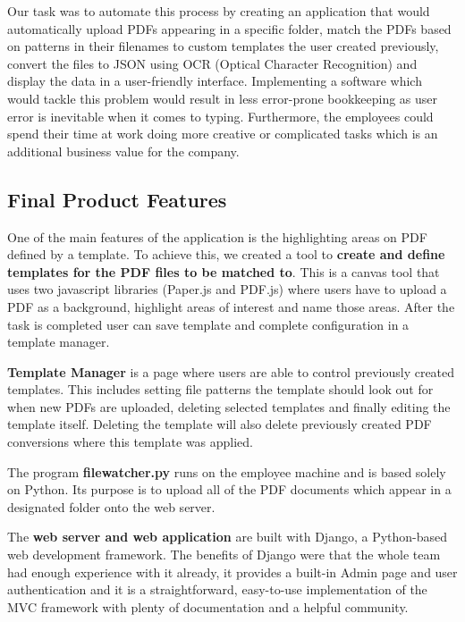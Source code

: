 \documentclass{l3proj}
\begin{document}
Our task was to automate this process by creating an application that would automatically upload PDFs appearing in a specific folder, match the PDFs based on patterns in their filenames to custom templates the user created previously, convert the files to JSON using OCR (Optical Character Recognition) and display the data in a user-friendly interface.
Implementing a software which would tackle this problem would result in less error-prone bookkeeping as user error is inevitable when it comes to typing. Furthermore, the employees could spend their time at work doing more creative or complicated tasks which is an additional business value for the company.
\subsection{Final Product Features}

One of the main features of the application is the highlighting areas on PDF defined by a template. To achieve this, we created a tool to \textbf{create and define templates for the PDF files to be matched to}. This is a canvas tool that uses two javascript libraries (Paper.js and PDF.js) where users have to upload a PDF as a background, highlight areas of interest and name those areas. After the task is completed user can save template and complete configuration in a template manager.

\textbf{Template Manager} is a page where users are able to control previously created templates. This includes setting file patterns the template should look out for when new PDFs are uploaded, deleting selected templates and finally editing the template itself. Deleting the template will also delete previously created PDF conversions where this template was applied.

The program \textbf{filewatcher.py} runs on the employee machine and is based solely on Python. Its purpose is to upload all of the PDF documents which appear in a designated folder onto the web server.

The \textbf{web server and web application} are built with Django, a Python-based web development framework. The benefits of Django were that the whole team had enough experience with it already, it provides a built-in Admin page and user authentication and it is a straightforward, easy-to-use implementation of the MVC framework with plenty of documentation and a helpful community.
\end{document}
